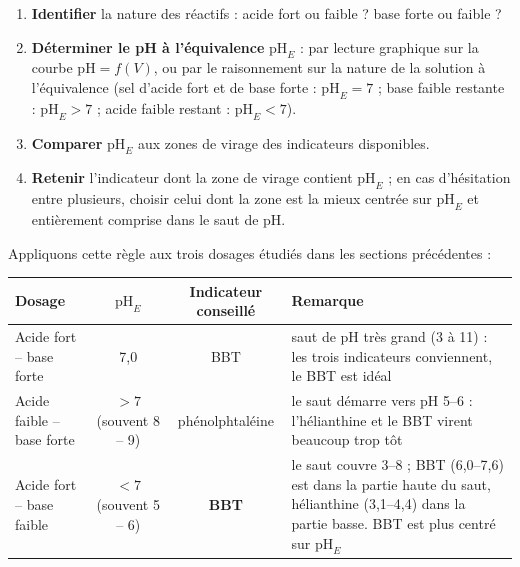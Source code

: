 \documentclass[11pt]{article}
\begin{document}
\begin{methode}
\begin{enumerate}
\item \textbf{Identifier} la nature des réactifs : acide fort ou faible ? base forte ou faible ?
\item \textbf{Déterminer le pH à l'équivalence} $\mathrm{pH}_E$ : par lecture graphique sur la courbe $\mathrm{pH} = f(V)$, ou par le raisonnement sur la nature de la solution à l'équivalence (sel d'acide fort et de base forte : $\mathrm{pH}_E = 7$ ; base faible restante : $\mathrm{pH}_E > 7$ ; acide faible restant : $\mathrm{pH}_E < 7$).
\item \textbf{Comparer} $\mathrm{pH}_E$ aux zones de virage des indicateurs disponibles.
\item \textbf{Retenir} l'indicateur dont la zone de virage contient $\mathrm{pH}_E$ ; en cas d'hésitation entre plusieurs, choisir celui dont la zone est la mieux centrée sur $\mathrm{pH}_E$ et entièrement comprise dans le saut de pH.
\end{enumerate}
\end{methode}

Appliquons cette règle aux trois dosages étudiés dans les sections précédentes :

\begin{center}
\begin{tabularx}{\linewidth}{|X|c|c|X|}
\hline
\rowcolor{popblueL} \textbf{Dosage} & $\mathrm{pH}_E$ & \textbf{Indicateur conseillé} & \textbf{Remarque} \\
\hline
Acide fort -- base forte & 7,0 & BBT & saut de pH très grand (3 à 11) : les trois indicateurs conviennent, le BBT est idéal \\
\hline
Acide faible -- base forte & $> 7$ (souvent 8 -- 9) & phénolphtaléine & le saut démarre vers pH 5--6 : l'hélianthine et le BBT virent beaucoup trop tôt \\
\hline
Acide fort -- base faible & $< 7$ (souvent 5 -- 6) & \textbf{BBT} & le saut couvre 3--8 ; BBT (6,0--7,6) est dans la partie haute du saut, hélianthine (3,1--4,4) dans la partie basse. BBT est plus centré sur $\mathrm{pH}_E$ \\
\hline
\end{tabularx}
\end{center}
\end{document}
